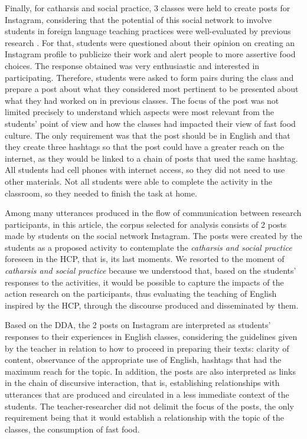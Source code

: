 \documentclass[english]{textolivre}
\begin{document}
Finally, for catharsis and social practice, 3 classes were held to create posts for Instagram, considering that the potential of this social network to involve students in foreign language teaching practices were well-evaluated by previous research \cite{prasetyawati2020integrating, aghayi2021instagram, garcia2022you, andujar2023foreign}. For that, students were questioned about their opinion on creating an Instagram profile to publicize their work and alert people to more assertive food choices. The response obtained was very enthusiastic and interested in participating. Therefore, students were asked to form pairs during the class and prepare a post about what they considered most pertinent to be presented about what they had worked on in previous classes. The focus of the post was not limited precisely to understand which aspects were most relevant from the students’ point of view and how the classes had impacted their view of fast food culture. The only requirement was that the post should be in English and that they create three hashtags so that the post could have a greater reach on the internet, as they would be linked to a chain of posts that used the same hashtag. All students had cell phones with internet access, so they did not need to use other materials. Not all students were able to complete the activity in the classroom, so they needed to finish the task at home.

Among many utterances produced in the flow of communication between research participants, in this article, the corpus selected for analysis consists of 2 posts made by students on the social network Instagram. The posts were created by the students as a proposed activity to contemplate the \emph{catharsis and social practice} foreseen in the HCP, that is, its last moments. We resorted to the moment of \emph{catharsis and social practice} because we understood that, based on the students’ responses to the activities, it would be possible to capture the impacts of the action research on the participants, thus evaluating the teaching of English inspired by the HCP, through the discourse produced and disseminated by them.

Based on the DDA, the 2 posts on Instagram are interpreted as students’ responses to their experiences in English classes, considering the guidelines given by the teacher in relation to how to proceed in preparing their texts: clarity of content, observance of the appropriate use of English, hashtags that had the maximum reach for the topic. In addition, the posts are also interpreted as links in the chain of discursive interaction, that is, establishing relationships with utterances that are produced and circulated in a less immediate context of the students. The teacher-researcher did not delimit the focus of the posts, the only requirement being that it would establish a relationship with the topic of the classes, the consumption of fast food.
\end{document}
